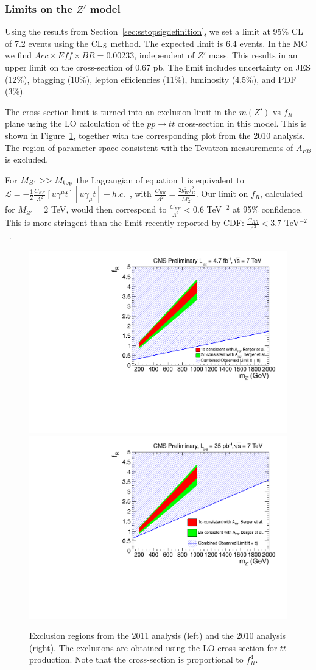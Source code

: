 \subsubsection{Limits on the $Z'$ model}
\label{sec:sstopslimits}
Using the results from Section~\ref{sec:sstopsigdefinition}, we set 
a limit at 95\% CL of 7.2 events using the CL$_{\rm S}$ method.
The expected limit is 6.4 events.
In the MC we find $Acc \times Eff \times BR = 0.00233$, independent of $Z'$ mass. 
This results in an upper limit on the cross-section of 0.67 pb.
The limit includes uncertainty
on JES (12\%), btagging (10\%), lepton efficiencies (11\%), luminosity (4.5\%),
and PDF (3\%).

The cross-section limit is turned into an exclusion limit in the $m(Z')$ vs $f_R$
plane using the LO calculation of the $pp \to tt$ cross-section in this model.
This is shown in Figure~\ref{fig:sstopexclusion}, together with the corresponding
plot from the 2010 analysis.  The region of parameter space consistent 
with the Tevatron measurements of $A_{FB}$ is excluded.


For $M_{Z'} >> M_{\rm top}$ the Lagrangian of equation 1 is 
equivalent to 
$\mathcal{L} = -\frac{1}{2}\frac{C_{RR}}{\Lambda^2}
 [\bar{u} \gamma^\mu t][\bar{u} \gamma_{\mu} t] + h.c.$~\cite{cdfth2},
with $\frac{C_{RR}}{\Lambda^2} = \frac{2 g_W^2 f_R^2}{M_{Z'}^2}$.
 Our limit on $f_R$, calculated for $M_{Z'}=2$ TeV, 
would then correspond to $\frac{C_{RR}}{\Lambda^2} < 0.6$ TeV$^{-2}$ at 
95\% confidence.  This is more stringent than the limit recently reported
by CDF: $\frac{C_{RR}}{\Lambda^2} < 3.7$ TeV$^{-2}$~\cite{cdflimit}.


\begin{figure}[htb]
\begin{center}
\includegraphics[width=0.45\linewidth]{figs/zprimecombined.pdf}
\includegraphics[width=0.45\linewidth]{figs/sscomb.pdf}
\caption{Exclusion regions from the 2011 analysis (left) and the 2010 analysis (right).
The exclusions are obtained using the LO cross-section for $tt$ production.  
Note that the cross-section is proportional to $f_R^4$.
\label{fig:sstopexclusion}}
\end{center}
\end{figure}

